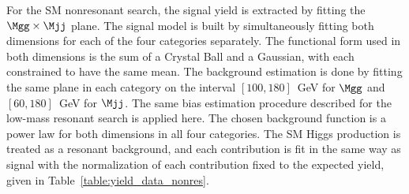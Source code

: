 For the SM nonresonant search, the signal yield is extracted by fitting the
$\Mgg \times \Mjj$ plane. The signal model is built by simultaneously fitting both dimensions
for each of the four categories separately.
The functional form used in both dimensions is the sum of a Crystal Ball and
a Gaussian, with each constrained to have the same mean. The background estimation is done by fitting
the same plane in each category on the interval $[100, 180]$~GeV for $\Mgg$ and $[60, 180]$~GeV
for $\Mjj$. The same bias estimation procedure
described for the low-mass resonant search is applied here. The chosen background function is a power
law for both dimensions in all four categories. The SM Higgs production is treated as a resonant
background, and each contribution is fit in the same way as signal with the normalization
of each contribution fixed to the expected yield, given in Table~\ref{table:yield_data_nonres}.

